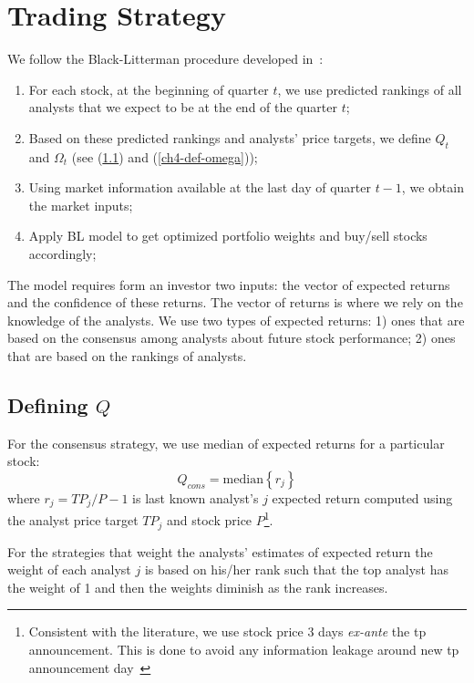 \documentclass[a4paper,twoside,12pt,openright,notitlepage]{report}\usepackage[]{graphicx}\usepackage[]{color}
\begin{document}
\section{Trading Strategy}
\label{ch4-sec:trading}


We follow the Black-Litterman procedure developed in~\cite{aiguzhinov2015a}:
\begin{enumerate}
\item For each stock, at the beginning of quarter $t$, we use predicted  rankings of all analysts that we expect to be at the end of the quarter $t$;
\item Based on these  predicted rankings and analysts' price targets,  we define $Q_{t}$ and $\Omega_{t}$ (see (\ref{ch4-def-q})  and (\ref{ch4-def-omega}));
\item Using market information available at the last day of quarter $t-1$, we obtain the market inputs;
\item Apply BL model to get  optimized portfolio weights and buy/sell stocks accordingly;
\end{enumerate}

The model requires form an investor two inputs: the vector of expected returns and the confidence of these returns. The vector of returns is where we rely on the knowledge of the analysts. We use two types of expected returns: 1) ones that are based on the consensus among analysts about future stock performance; 2) ones that are based on the rankings of analysts.

\subsection{Defining $Q$}
\label{ch4-def-q}

For the consensus strategy, we use median of expected returns for a particular stock:
\begin{equation}
\label{ch4-consq}
Q_{cons}= \mathrm{median} \left\{r_{j}\right\}
\end{equation}
where $r_{j}=TP_{j}/P-1$  is last known analyst's $j$ expected return computed using the analyst price target $TP_{j}$ and stock price $P$\footnote{Consistent with the literature, we use stock price 3 days \emph{ex-ante} the \gls{tp} announcement. This is done to avoid any information leakage around new \gls{tp} announcement day~\citep{bonini2010}}.

For the strategies that weight the analysts' estimates of expected return the weight of each analyst $j$ is based on his/her rank such that the top analyst has the weight of 1 and then the weights diminish as the rank increases.
\end{document}
